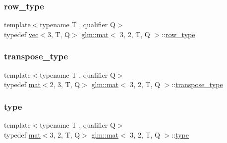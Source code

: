 \mbox{\label{structglm_1_1mat_3_013_00_012_00_01_t_00_01_q_01_4_a0b91ceeaafce26ca1b6b64f8ea34dbb1}} 
\subsubsection{\texorpdfstring{row\+\_\+type}{row\_type}}
{\footnotesize\ttfamily template$<$typename T , qualifier Q$>$ \\
typedef \hyperlink{structglm_1_1vec}{vec}$<$3, T, Q$>$ \hyperlink{structglm_1_1mat}{glm\+::mat}$<$ 3, 2, T, Q $>$\+::\hyperlink{structglm_1_1mat_3_013_00_012_00_01_t_00_01_q_01_4_a0b91ceeaafce26ca1b6b64f8ea34dbb1}{row\+\_\+type}}

\mbox{\label{structglm_1_1mat_3_013_00_012_00_01_t_00_01_q_01_4_ab5fe2bf92b71a51cd33be87c6c9ef7d1}} 
\subsubsection{\texorpdfstring{transpose\+\_\+type}{transpose\_type}}
{\footnotesize\ttfamily template$<$typename T , qualifier Q$>$ \\
typedef \hyperlink{structglm_1_1mat}{mat}$<$2, 3, T, Q$>$ \hyperlink{structglm_1_1mat}{glm\+::mat}$<$ 3, 2, T, Q $>$\+::\hyperlink{structglm_1_1mat_3_013_00_012_00_01_t_00_01_q_01_4_ab5fe2bf92b71a51cd33be87c6c9ef7d1}{transpose\+\_\+type}}

\mbox{\label{structglm_1_1mat_3_013_00_012_00_01_t_00_01_q_01_4_acc76b4ad182b342b586dce28e0da8e16}} 
\subsubsection{\texorpdfstring{type}{type}}
{\footnotesize\ttfamily template$<$typename T , qualifier Q$>$ \\
typedef \hyperlink{structglm_1_1mat}{mat}$<$3, 2, T, Q$>$ \hyperlink{structglm_1_1mat}{glm\+::mat}$<$ 3, 2, T, Q $>$\+::\hyperlink{structglm_1_1mat_3_013_00_012_00_01_t_00_01_q_01_4_acc76b4ad182b342b586dce28e0da8e16}{type}}

